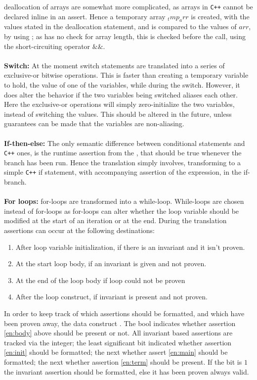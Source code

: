 deallocation of arrays are somewhat more complicated, as arrays in \texttt{C++} cannot be
declared inline in an assert. Hence a temporary array $_tmp_arr$ is created, with the values
stated in the deallocation statement, and is compared to the values of $arr$, by using
; as  has no check for array length, this is checked before the
call, using the short-circuiting operator $\&\&$.
\\
\\
\textbf{Switch:}
At the moment switch statements are translated into a series of exclusive-or bitwise operations.
This is faster than creating a temporary variable to hold, the value of one of the variables, 
while during the switch. However, it does alter the behavior if the two variables being
switched aliases each other. Here the exclusive-or operations will simply zero-initialize
the two variables, instead of switching the values. This should be altered in the future,
unless guarantees can be made that the variables are non-aliasing.
\\
\\
\textbf{If-then-else:}
The only semantic difference between \lan conditional statements and \texttt{C++} ones,
is the runtime assertion from the , that should be true whenever the 
branch has been run. Hence the translation simply involves, transforming to a simple
\texttt{C++} if statement, with accompanying assertion of the  expression, in the
if-branch.
\\
\\
\textbf{For loops:}
\lan for-loops are transformed into a while-loop. While-loops are chosen instead of for-loops
as \lan for-loops can alter whether the loop variable should be modified at the start of an
iteration or at the end. During the translation assertions can occur at the following
destinations:
\begin{enumerate}
      \item \label{en:init} After loop variable initialization, if there is an invariant and it isn't proven.
      \item \label{en:main} At the start loop body, if an invariant is given and not proven.
      \item \label{en:body} At the end of the loop body if loop could not be proven
      \item \label{en:term} After the loop construct, if invariant is present and not proven.
\end{enumerate}
\noindent
In order to keep track of which assertions should be formatted, and which have been proven
away, the data construct . The bool indicates whether
assertion \ref{en:body} above should be present or not. All invariant based assertions are
tracked via the  integer; the least significant bit indicated whether
assertion \ref{en:init} should be formatted; the next whether assert \ref{en:main} should
be formatted; the next whether assertion \ref{en:term} should be present. If the bit is
$1$ the invariant assertion should be formatted, else it has been proven always valid.